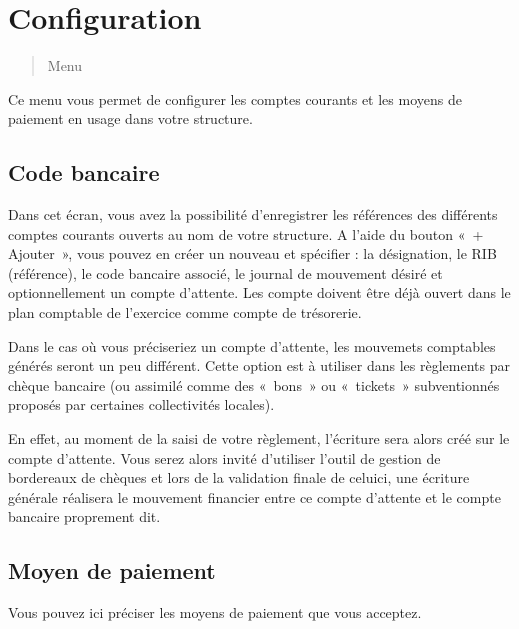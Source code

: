 \documentclass[a4paper,10pt,oneside,french]{sphinxmanual}
\begin{document}
\section{Configuration}
\label{\detokenize{payoff/config:configuration}}\label{\detokenize{payoff/config::doc}}\begin{quote}

\sphinxAtStartPar
Menu 
\end{quote}

\sphinxAtStartPar
Ce menu vous permet de configurer les comptes courants et les moyens de paiement en usage dans votre structure.


\subsection{Code bancaire}
\label{\detokenize{payoff/config:code-bancaire}}
\sphinxAtStartPar
Dans cet écran, vous avez la possibilité d’enregistrer les références des différents comptes courants ouverts au nom de votre structure.
A l’aide du bouton « + Ajouter », vous pouvez en créer un nouveau et spécifier : la désignation, le RIB (référence), le code bancaire associé, le journal de mouvement désiré et optionnellement un compte d’attente.
Les compte doivent être déjà ouvert dans le plan comptable de l’exercice comme compte de trésorerie.

\sphinxAtStartPar
Dans le cas où vous préciseriez un compte d’attente, les mouvemets comptables générés seront un peu différent.
Cette option est à utiliser dans les règlements par chèque bancaire (ou assimilé comme des « bons » ou « tickets » subventionnés proposés par certaines collectivités locales).

\sphinxAtStartPar
En effet, au moment de la saisi de votre règlement, l’écriture sera alors créé sur le compte d’attente.
Vous serez alors invité d’utiliser l’outil de gestion de bordereaux de chèques et lors de la validation finale de celui\sphinxhyphen{}ci,
une écriture générale réalisera le mouvement financier entre ce compte d’attente et le compte bancaire proprement dit.


\subsection{Moyen de paiement}
\label{\detokenize{payoff/config:moyen-de-paiement}}
\sphinxAtStartPar
Vous pouvez ici préciser les moyens de paiement que vous acceptez.
\end{document}
